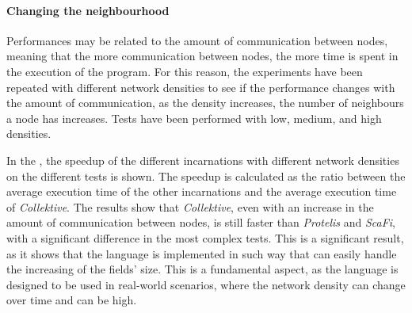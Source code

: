\paragraph{Changing the neighbourhood}
Performances may be related to the amount of communication between nodes, meaning that the more communication
between nodes, the more time is spent in the execution of the program.
For this reason, the experiments have been repeated with different network densities to see if the performance changes with
the amount of communication, as the density increases, the number of neighbours a node has increases.
Tests have been performed with low, medium, and high densities.

In the , the speedup of the different incarnations with different network densities on the different tests is shown.
The speedup is calculated as the ratio between the average execution time of the other incarnations and the average execution time of
\emph{Collektive}.
The results show that \emph{Collektive}, even with an increase in the amount of communication between nodes, is still
faster than \emph{Protelis} and \emph{ScaFi}, with a significant difference in the most complex tests.
This is a significant result, as it shows that the language is implemented in such way that can easily handle the increasing
of the fields' size.
This is a fundamental aspect, as the language is designed to be used in real-world scenarios, where the network density
can change over time and can be high.

